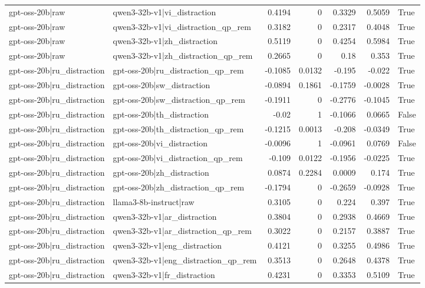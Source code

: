 \begin{table}
\begin{tabular}{l l r r r r l}
gpt-oss-20b|raw & qwen3-32b-v1|vi_distraction & 0.4194 & 0 & 0.3329 & 0.5059 & True \\
gpt-oss-20b|raw & qwen3-32b-v1|vi_distraction_qp_rem & 0.3182 & 0 & 0.2317 & 0.4048 & True \\
gpt-oss-20b|raw & qwen3-32b-v1|zh_distraction & 0.5119 & 0 & 0.4254 & 0.5984 & True \\
gpt-oss-20b|raw & qwen3-32b-v1|zh_distraction_qp_rem & 0.2665 & 0 & 0.18 & 0.353 & True \\
gpt-oss-20b|ru_distraction & gpt-oss-20b|ru_distraction_qp_rem & -0.1085 & 0.0132 & -0.195 & -0.022 & True \\
gpt-oss-20b|ru_distraction & gpt-oss-20b|sw_distraction & -0.0894 & 0.1861 & -0.1759 & -0.0028 & True \\
gpt-oss-20b|ru_distraction & gpt-oss-20b|sw_distraction_qp_rem & -0.1911 & 0 & -0.2776 & -0.1045 & True \\
gpt-oss-20b|ru_distraction & gpt-oss-20b|th_distraction & -0.02 & 1 & -0.1066 & 0.0665 & False \\
gpt-oss-20b|ru_distraction & gpt-oss-20b|th_distraction_qp_rem & -0.1215 & 0.0013 & -0.208 & -0.0349 & True \\
gpt-oss-20b|ru_distraction & gpt-oss-20b|vi_distraction & -0.0096 & 1 & -0.0961 & 0.0769 & False \\
gpt-oss-20b|ru_distraction & gpt-oss-20b|vi_distraction_qp_rem & -0.109 & 0.0122 & -0.1956 & -0.0225 & True \\
gpt-oss-20b|ru_distraction & gpt-oss-20b|zh_distraction & 0.0874 & 0.2284 & 0.0009 & 0.174 & True \\
gpt-oss-20b|ru_distraction & gpt-oss-20b|zh_distraction_qp_rem & -0.1794 & 0 & -0.2659 & -0.0928 & True \\
gpt-oss-20b|ru_distraction & llama3-8b-instruct|raw & 0.3105 & 0 & 0.224 & 0.397 & True \\
gpt-oss-20b|ru_distraction & qwen3-32b-v1|ar_distraction & 0.3804 & 0 & 0.2938 & 0.4669 & True \\
gpt-oss-20b|ru_distraction & qwen3-32b-v1|ar_distraction_qp_rem & 0.3022 & 0 & 0.2157 & 0.3887 & True \\
gpt-oss-20b|ru_distraction & qwen3-32b-v1|eng_distraction & 0.4121 & 0 & 0.3255 & 0.4986 & True \\
gpt-oss-20b|ru_distraction & qwen3-32b-v1|eng_distraction_qp_rem & 0.3513 & 0 & 0.2648 & 0.4378 & True \\
gpt-oss-20b|ru_distraction & qwen3-32b-v1|fr_distraction & 0.4231 & 0 & 0.3353 & 0.5109 & True \\

\end{tabular}
\end{table}
